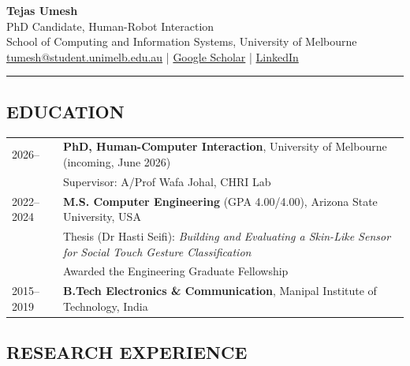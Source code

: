 \documentclass[a4paper, 11pt]{article}
\begin{document}
\begin{center}
  {\Large\textbf{Tejas Umesh}}\\[2pt]
  PhD Candidate, Human-Robot Interaction \\
  School of Computing and Information Systems, University of Melbourne\\[2pt]
  \href{mailto:tumesh@student.unimelb.edu.au}{tumesh@student.unimelb.edu.au}
  \;|\;
  \href{https://scholar.google.fr/citations?user=kW4x2ZUAAAAJ}{Google Scholar}
  \;|\;
  \href{https://www.linkedin.com/in/tejas-umesh}{LinkedIn}
\end{center}

\smallskip
\hrule
\smallskip

{\small

\subsection{EDUCATION}
\vspace{2pt}

\noindent
\begin{tabularx}{\textwidth}{@{}lX@{}}
2026--     & \textbf{PhD, Human-Computer Interaction}, University of Melbourne (incoming, June 2026) \\
           & Supervisor: A/Prof Wafa Johal, CHRI Lab \\[3pt]
2022--2024 & \textbf{M.S. Computer Engineering} (GPA 4.00/4.00), Arizona State University, USA \\
           & Thesis (Dr Hasti Seifi): \textit{Building and Evaluating a Skin-Like Sensor for Social Touch Gesture Classification} \\
           & Awarded the Engineering Graduate Fellowship \\[3pt]
2015--2019 & \textbf{B.Tech Electronics \& Communication}, Manipal Institute of Technology, India \\
\end{tabularx}

\smallskip

\subsection{RESEARCH EXPERIENCE}
\vspace{2pt}

}
\end{document}
